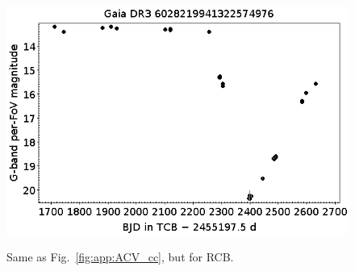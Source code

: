 \documentclass[longauth]{aa}
\begin{document}
\begin{appendix}
\begin{figure}
\hspace{2mm}
 \includegraphics[width=0.45\hsize]{figures/appendix/RCB-44.png} \\
\vspace{4mm}
 \caption{Same as Fig.~\ref{fig:app:ACV_cc}, but for RCB.}
 \label{fig:app:RCB_cc}
\end{figure}




\end{appendix}
\end{document}
